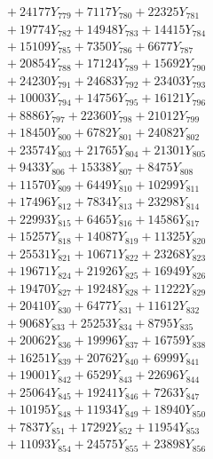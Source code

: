 \documentclass[a4paper,10pt]{article}
\begin{document}
{\begin{align}
&\;  + 24177 Y_{779} + 7117 Y_{780} + 22325 Y_{781} \\[0.3ex]
&\;  + 19774 Y_{782} + 14948 Y_{783} + 14415 Y_{784} \\[0.3ex]
&\;  + 15109 Y_{785} + 7350 Y_{786} + 6677 Y_{787} \\[0.3ex]
&\;  + 20854 Y_{788} + 17124 Y_{789} + 15692 Y_{790} \\[0.3ex]
&\;  + 24230 Y_{791} + 24683 Y_{792} + 23403 Y_{793} \\[0.3ex]
&\;  + 10003 Y_{794} + 14756 Y_{795} + 16121 Y_{796} \\[0.3ex]
&\;  + 8886 Y_{797} + 22360 Y_{798} + 21012 Y_{799} \\[0.3ex]
&\;  + 18450 Y_{800} + 6782 Y_{801} + 24082 Y_{802} \\[0.3ex]
&\;  + 23574 Y_{803} + 21765 Y_{804} + 21301 Y_{805} \\[0.3ex]
&\;  + 9433 Y_{806} + 15338 Y_{807} + 8475 Y_{808} \\[0.5ex]\allowbreak
&\;  + 11570 Y_{809} + 6449 Y_{810} + 10299 Y_{811} \\[0.3ex]
&\;  + 17496 Y_{812} + 7834 Y_{813} + 23298 Y_{814} \\[0.3ex]
&\;  + 22993 Y_{815} + 6465 Y_{816} + 14586 Y_{817} \\[0.3ex]
&\;  + 15257 Y_{818} + 14087 Y_{819} + 11325 Y_{820} \\[0.3ex]
&\;  + 25531 Y_{821} + 10671 Y_{822} + 23268 Y_{823} \\[0.3ex]
&\;  + 19671 Y_{824} + 21926 Y_{825} + 16949 Y_{826} \\[0.3ex]
&\;  + 19470 Y_{827} + 19248 Y_{828} + 11222 Y_{829} \\[0.3ex]
&\;  + 20410 Y_{830} + 6477 Y_{831} + 11612 Y_{832} \\[0.3ex]
&\;  + 9068 Y_{833} + 25253 Y_{834} + 8795 Y_{835} \\[0.3ex]
&\;  + 20062 Y_{836} + 19996 Y_{837} + 16759 Y_{838} \\[0.5ex]\allowbreak
&\;  + 16251 Y_{839} + 20762 Y_{840} + 6999 Y_{841} \\[0.3ex]
&\;  + 19001 Y_{842} + 6529 Y_{843} + 22696 Y_{844} \\[0.3ex]
&\;  + 25064 Y_{845} + 19241 Y_{846} + 7263 Y_{847} \\[0.3ex]
&\;  + 10195 Y_{848} + 11934 Y_{849} + 18940 Y_{850} \\[0.3ex]
&\;  + 7837 Y_{851} + 17292 Y_{852} + 11954 Y_{853} \\[0.3ex]
&\;  + 11093 Y_{854} + 24575 Y_{855} + 23898 Y_{856} \\[0.3ex]

\end{align}}
\end{document}
